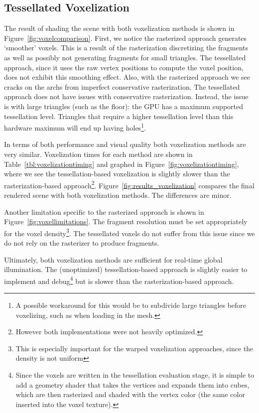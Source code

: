 \subsection{Tessellated Voxelization}
The result of shading the scene with both voxelization methods is shown in Figure~\ref{fig:voxelcomparison}. First, we notice the rasterized approach generates `smoother' voxels. This is a result of the rasterization discretizing the fragments as well as possibly not generating fragments for small triangles. The tessellated approach, since it uses the raw vertex positions to compute the voxel position, does not exhibit this smoothing effect. Also, with the rasterized approach we see cracks on the archs from imperfect conservative rasterization. The tessellated approach does not have issues with conservative rasterization. Instead, the issue is with large triangles (such as the floor): the GPU has a maximum supported tessellation level. Triangles that require a higher tessellation level than this hardware maximum will end up having holes\footnote{A possible workaround for this would be to subdivide large triangles before voxelizing, such as when loading in the mesh.}.

In terms of both performance and visual quality both voxelization methods are very similar. Voxelization times for each method are shown in Table~\ref{tbl:voxelizationtiming} and graphed in Figure~\ref{fig:voxelizationtiming}, where we see the tessellation-based voxelization is slightly slower than the rasterization-based approach\footnote{However both implementations were not heavily optimized.}. Figure~\ref{fig:results_voxelization} compares the final rendered scene with both voxelization methods. The differences are minor.

Another limitation specific to the rasterized approach is shown in Figure~\ref{fig:voxellimitations}. The fragment resolution must be set appropriately for the voxel density\footnote{This is especially important for the warped voxelization approaches, since the density is not uniform}. The tessellated voxels do not suffer from this issue since we do not rely on the rasterizer to produce fragments.

Ultimately, both voxelization methods are sufficient for real-time global illumination. The (unoptimized) tessellation-based approach is slightly easier to implement and debug\footnote{Since the voxels are written in the tessellation evaluation stage, it is simple to add a geometry shader that takes the vertices and expands them into cubes, which are then rasterized and shaded with the vertex color (the same color inserted into the voxel texture).} but is slower than the rasterization-based approach. %


